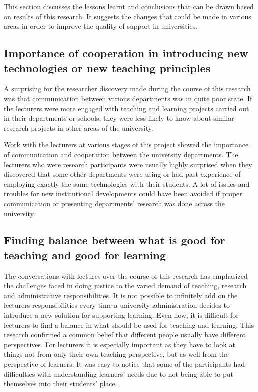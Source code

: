 This section discusses the lessons learnt and conclusions that can be drawn
based on results of this research. It suggests the changes that could be made in
various areas in order to improve the quality of \LLLs support in universities.

\subsection[Cooperation and Communication]{Importance of cooperation in 
introducing new technologies or new teaching principles}

A surprising for the researcher discovery made during the course of this
research was that communication between various departments was in quite poor
state. If the lecturers were more engaged with teaching and learning projects
carried out in their departments or schools, they were less likely to know about
similar research projects in other areas of the university. 

Work with the lecturers at various stages of this project showed the importance
of communication and cooperation between the university departments. The
lecturers who were research participants were usually highly surprised when they
discovered that some other departments were using or had past experience of
employing exactly the same technologies with their students. A lot of issues and
troubles for new institutional developments could have been avoided if proper
communication or presenting departments' research was done across the university.

\subsection[Finding Balance]{Finding balance between what is good for teaching
and good for learning}

The conversations with lectures over the course of this research has emphasized
the challenges faced in doing justice to the varied demand of teaching, research
and administrative responsibilities. It is not possible to infinitely add on the
lecturers responsibilities every time a university administration decides to
introduce a new solution for supporting learning. Even now, it is difficult for
lecturers to find a balance in what should be used for teaching and learning.
This research confirmed a common belief that different people usually have
different perspectives. For lecturers it is especially important as they have to
look at things not from only their own teaching perspective, but as well from
the perspective of learners. It was easy to notice that some of the participants
had difficulties with understanding learners' needs due to not being able to put
themselves into their students' place.

